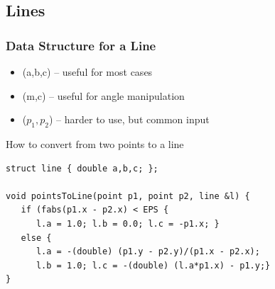 \subsection{Lines}

\begin{frame}[fragile]
  \frametitle{Data Structure for a Line}
  \begin{itemize}
  \item {}\hfill (a,b,c) -- useful for most cases
  \item {}\hfill (m,c) -- useful for angle manipulation
  \item {}\hfill ($p_1, p_2$) -- harder to use, but common input
  \end{itemize}

{\smaller
  \begin{exampleblock}{How to convert from two points to a line}
\begin{verbatim}
struct line { double a,b,c; };

void pointsToLine(point p1, point p2, line &l) {
   if (fabs(p1.x - p2.x) < EPS {
      l.a = 1.0; l.b = 0.0; l.c = -p1.x; }
   else {
      l.a = -(double) (p1.y - p2.y)/(p1.x - p2.x);
      l.b = 1.0; l.c = -(double) (l.a*p1.x) - p1.y;}
}
\end{verbatim}
  \end{exampleblock}
  }
\end{frame}

